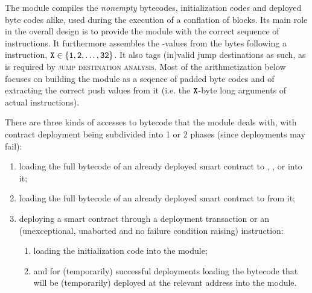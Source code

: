 The \romMod{} module compiles the \emph{nonempty} bytecodes, initialization codes and deployed byte codes alike, used during the execution of a conflation of blocks.
Its main role in the overall design is to provide the \hubMod{} module with the correct sequence of instructions.
It furthermore assembles the -values from the bytes following a  instruction, $\texttt{X} \in \{ \texttt{1}, \texttt{2}, \dots, \texttt{32} \}$.
It also tags (in)valid jump destinations as such, as is required by \textsc{jump destination analysis}.
Most of the arithmetization below focuses on building the \romMod{} module as a seqence of padded byte codes and of extracting the correct push values from it (i.e. the $\texttt{X}$-byte long arguments of actual  instructions).

There are three kinds of accesses to bytecode that the \romMod{} module  deals with, with contract deployment being subdivided into 1 or 2 phases (since deployments may fail):
\begin{enumerate}
    \item loading the full bytecode of an already deployed smart contract to , ,  or  into it;
    \item loading the full bytecode of an already deployed smart contract to  from it;
    \item deploying a smart contract through a deployment transaction or an (unexceptional, unaborted and no failure condition raising)  instruction:
        \begin{enumerate}
            \item loading the initialization code into the \romMod{} module;
            \item and for (temporarily) successful deployments loading the bytecode that will be (temporarily) deployed at the relevant address into the \romMod{} module.
        \end{enumerate}
\end{enumerate}

